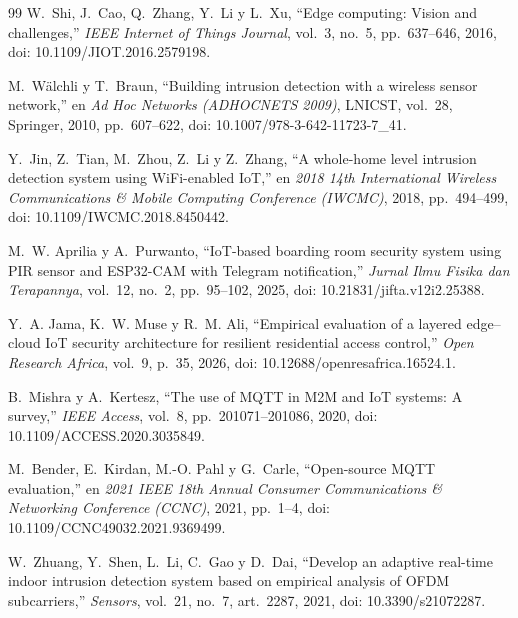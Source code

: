 \documentclass[manuscript,screen,nonacm]{acmart}
\begin{document}
\begin{thebibliography}{99}
W.~Shi, J.~Cao, Q.~Zhang, Y.~Li y L.~Xu, ``Edge computing: Vision and challenges,'' \emph{IEEE Internet of Things Journal}, vol.~3, no.~5, pp.~637--646, 2016, doi: 10.1109/JIOT.2016.2579198.

M.~Wälchli y T.~Braun, ``Building intrusion detection with a wireless sensor network,'' en \emph{Ad Hoc Networks (ADHOCNETS 2009)}, LNICST, vol.~28, Springer, 2010, pp.~607--622, doi: 10.1007/978-3-642-11723-7\_41.

Y.~Jin, Z.~Tian, M.~Zhou, Z.~Li y Z.~Zhang, ``A whole-home level intrusion detection system using WiFi-enabled IoT,'' en \emph{2018 14th International Wireless Communications \& Mobile Computing Conference (IWCMC)}, 2018, pp.~494--499, doi: 10.1109/IWCMC.2018.8450442.

M.~W. Aprilia y A.~Purwanto, ``IoT-based boarding room security system using PIR sensor and ESP32-CAM with Telegram notification,'' \emph{Jurnal Ilmu Fisika dan Terapannya}, vol.~12, no.~2, pp.~95--102, 2025, doi: 10.21831/jifta.v12i2.25388.

Y.~A. Jama, K.~W. Muse y R.~M. Ali, ``Empirical evaluation of a layered edge--cloud IoT security architecture for resilient residential access control,'' \emph{Open Research Africa}, vol.~9, p.~35, 2026, doi: 10.12688/openresafrica.16524.1.

B.~Mishra y A.~Kertesz, ``The use of MQTT in M2M and IoT systems: A survey,'' \emph{IEEE Access}, vol.~8, pp.~201071--201086, 2020, doi: 10.1109/ACCESS.2020.3035849.

M.~Bender, E.~Kirdan, M.-O. Pahl y G.~Carle, ``Open-source MQTT evaluation,'' en \emph{2021 IEEE 18th Annual Consumer Communications \& Networking Conference (CCNC)}, 2021, pp.~1--4, doi: 10.1109/CCNC49032.2021.9369499.

W.~Zhuang, Y.~Shen, L.~Li, C.~Gao y D.~Dai, ``Develop an adaptive real-time indoor intrusion detection system based on empirical analysis of OFDM subcarriers,'' \emph{Sensors}, vol.~21, no.~7, art.~2287, 2021, doi: 10.3390/s21072287.

\end{thebibliography}
\end{document}
